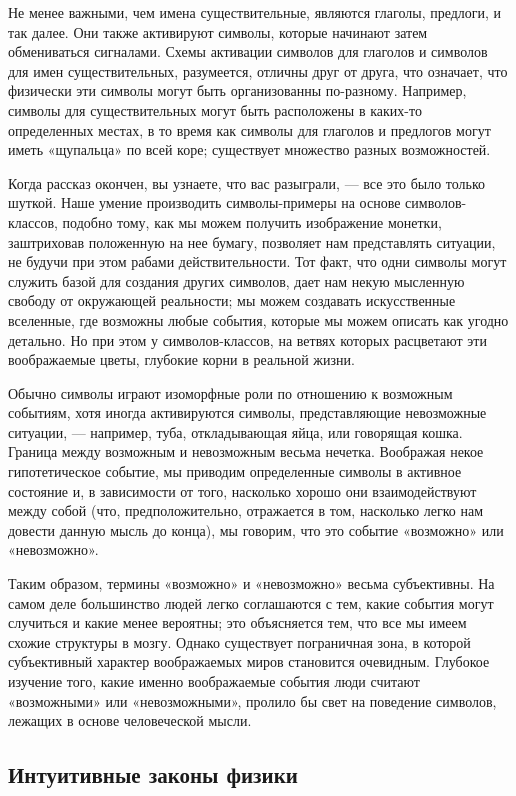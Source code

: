 \documentclass[../main.tex]{subfiles}
\begin{document}
Не менее важными, чем имена существительные, являются глаголы, предлоги, и так далее. Они также активируют символы, которые начинают затем обмениваться сигналами. Схемы активации символов для глаголов и символов для имен существительных, разумеется, отличны друг от друга, что означает, что физически эти символы могут быть организованны по-разному. Например, символы для существительных могут быть расположены в каких-то определенных местах, в то время как символы для глаголов и предлогов могут иметь «щупальца» по всей коре; существует множество разных возможностей.

Когда рассказ окончен, вы узнаете, что вас разыграли, --- все это было только шуткой. Наше умение производить символы-примеры на основе символов-классов, подобно тому, как мы можем получить изображение монетки, заштриховав положенную на нее бумагу, позволяет нам представлять ситуации, не будучи при этом рабами действительности. Тот факт, что одни символы могут служить базой для создания других символов, дает нам некую мысленную свободу от окружающей реальности; мы можем создавать искусственные вселенные, где возможны любые события, которые мы можем описать как угодно детально. Но при этом у символов-классов, на ветвях которых расцветают эти воображаемые цветы, глубокие корни в реальной жизни.

Обычно символы играют изоморфные роли по отношению к возможным событиям, хотя иногда активируются символы, представляющие невозможные ситуации, --- например, туба, откладывающая яйца, или говорящая кошка. Граница между возможным и невозможным весьма нечетка. Воображая некое гипотетическое событие, мы приводим определенные символы в активное состояние и, в зависимости от того, насколько хорошо они взаимодействуют между собой (что, предположительно, отражается в том, насколько легко нам довести данную мысль до конца), мы говорим, что это событие «возможно» или «невозможно».

Таким образом, термины «возможно» и «невозможно» весьма субъективны. На самом деле большинство людей легко соглашаются с тем, какие события могут случиться и какие менее вероятны; это объясняется тем, что все мы имеем схожие структуры в мозгу. Однако существует пограничная зона, в которой субъективный характер воображаемых миров становится очевидным. Глубокое изучение того, какие именно воображаемые события люди считают «возможными» или «невозможными», пролило бы свет на поведение символов, лежащих в основе человеческой мысли.

\subsection{Интуитивные законы физики}
\end{document}
